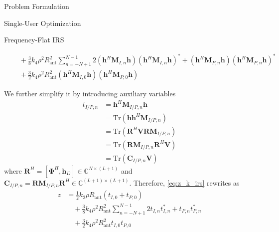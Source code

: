 \documentclass{IEEEtran}
\begin{document}
\begin{section}{Problem Formulation}
\begin{subsection}{Single-User Optimization}
\begin{subsubsection}{Frequency-Flat IRS}
\begin{figure*}[b]
\begin{equation}
\begin{split}
						&\quad+\frac{3}{8}{k_4}{\rho^2}{R_{\text{ant}}^2}\sum_{n=-N+1}^{N-1}{2(\boldsymbol{h}^H\boldsymbol{M}_{I,n}\boldsymbol{h})(\boldsymbol{h}^H\boldsymbol{M}_{I,n}\boldsymbol{h})^*+(\boldsymbol{h}^H\boldsymbol{M}_{P,n}\boldsymbol{h})(\boldsymbol{h}^H\boldsymbol{M}_{P,n}\boldsymbol{h})^*}\\
						&\quad+\frac{3}{2}{k_4}{\rho^2}{R_{\text{ant}}^2}{(\boldsymbol{h}^H\boldsymbol{M}_{I,0}\boldsymbol{h})(\boldsymbol{h}^H\boldsymbol{M}_{P,0}\boldsymbol{h})}
					\end{split}
				\end{equation}
			\end{figure*}
			We further simplify it by introducing auxiliary variables
			\begin{equation}\label{eq:t}
				\begin{split}
					t_{I/P,n}
					&=\boldsymbol{h}^H\boldsymbol{M}_{I/P,n}\boldsymbol{h}\\
					&=\mathrm{Tr}(\boldsymbol{h}\boldsymbol{h}^H\boldsymbol{M}_{I/P,n})\\
					&=\mathrm{Tr}(\boldsymbol{R}^H\boldsymbol{V}\boldsymbol{R}\boldsymbol{M}_{I/P,n})\\
					&=\mathrm{Tr}(\boldsymbol{R}\boldsymbol{M}_{I/P,n}\boldsymbol{R}^H\boldsymbol{V})\\
					&=\mathrm{Tr}(\boldsymbol{C}_{I/P,n}\boldsymbol{V})
				\end{split}
			\end{equation}
			where $\boldsymbol{R}^H=[\boldsymbol{\Phi}^H,\boldsymbol{h}_D] \in \mathbb{C}^{N \times (L+1)}$ and $\boldsymbol{C}_{I/P,n}=\boldsymbol{R}\boldsymbol{M}_{I/P,n}\boldsymbol{R}^H \in \mathbb{C}^{(L+1)\times(L+1)}$. Therefore, \ref{eq:z_k_irs} rewrites as
			\begin{equation}\label{eq:z_k_irs_t}
				\begin{split}
					z
					&=\frac{1}{2}{k_2}{\rho}{R_{\text{ant}}}(t_{I,0}+t_{P,0})\\
					&\quad+\frac{3}{8}{k_4}{\rho^2}{R_{\text{ant}}^2}\sum_{n=-N+1}^{N-1}{2t_{I,n}t_{I,n}^*+t_{P,n}t_{P,n}^*}\\
					&\quad+\frac{3}{2}{k_4}{\rho^2}{R_{\text{ant}}^2}t_{I,0}t_{P,0}
				\end{split}
			\end{equation}


\end{subsubsection}
\end{subsection}
\end{section}
\end{document}
